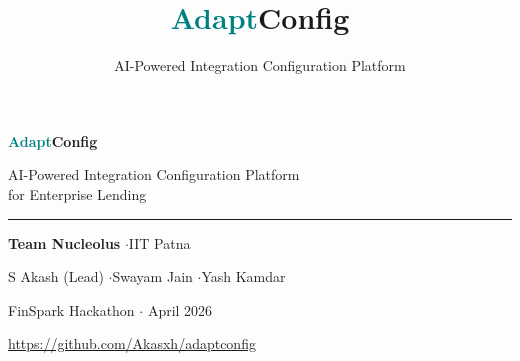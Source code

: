 \documentclass[aspectratio=169,11pt]{beamer}
\title{\textcolor{teal}{Adapt}Config}
\subtitle{AI-Powered Integration Configuration Platform}
\author{}
\institute{}
\date{}
\begin{document}
\begin{frame}[plain]
\vspace{1.2cm}
\begin{center}
{\Huge\bfseries \textcolor{teal}{Adapt}Config}

\vspace{0.4em}
{\large\color{ts} AI-Powered Integration Configuration Platform\\for Enterprise Lending}

\vspace{1em}
{\color{teal}\rule{6cm}{0.5pt}}

\vspace{0.8em}
{\normalsize\textbf{Team Nucleolus} \quad$\cdot$\quad IIT Patna}

\vspace{0.4em}
{\normalsize S Akash (Lead) \quad$\cdot$\quad Swayam Jain \quad$\cdot$\quad Yash Kamdar}

\vspace{0.8em}
{\small\color{ts} FinSpark Hackathon $\cdot$ April 2026}

\vspace{0.5em}
{\scriptsize\color{ts} \url{https://github.com/Akasxh/adaptconfig}}
\end{center}
\end{frame}
\end{document}
